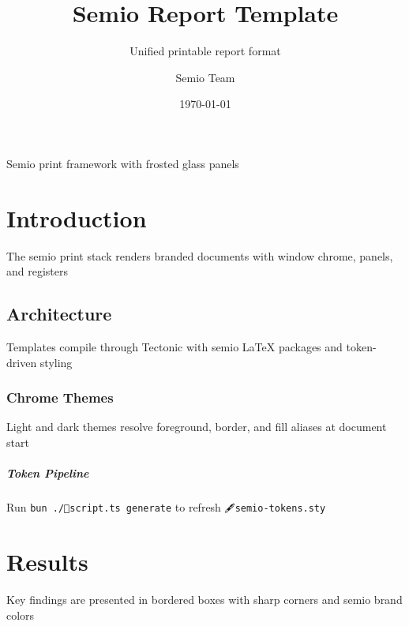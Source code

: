\title{Semio Report Template}
\author{Semio Team}
\date{\today}
\subtitle{Unified printable report format}




\maketitle
\tableofcontents

\begin{Panel}[anchor=top-right, x=1cm, y=5cm, width=5.5cm]
  Semio print framework with frosted glass panels
\end{Panel}

\chapter{Introduction}
The semio print stack renders branded documents with window chrome, panels, and registers

\section{Architecture}
\begin{Window}[title=Print Pipeline]
  Templates compile through Tectonic with semio LaTeX packages and token-driven styling
\end{Window}

\subsection{Chrome Themes}
Light and dark themes resolve foreground, border, and fill aliases at document start

\paragraph{Token Pipeline}
Run \texttt{bun ./📜️script.ts generate} to refresh \texttt{🖋️semio-tokens.sty}

\chapter{Results}
\begin{Blockquote}
  Key findings are presented in bordered boxes with sharp corners and semio brand colors
\end{Blockquote}

